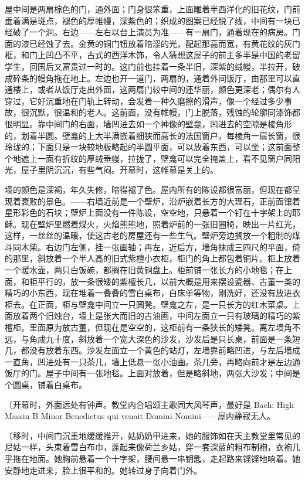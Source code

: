 屋中间是两扇棕色的门，通外面；门身很笨重，上面雕着半西洋化的旧花纹，门前垂着满是斑点，褪色的厚帷幔，深紫色的；织成的图案已经脱了线，中间有一块已经破了一个洞。右边——左右以台上演员为准——有一扇门，通着现在的病房。门面的漆已经蚀了去。金黄的铜门钮放着暗涩的光，配起那高而宽，有黄花纹的灰门框，和门上凹凸不平，古式的西洋木饰，令人猜想这屋子的前主多半是中国的老留学生，回国后又富贵过一时的。这门前也挂着一条半旧，深紫的绒幔，半拉开，破成碎条的幔角拖在地上。左边也开一道门，两扇的，通着外间饭厅，由那里可以直通楼上，或者从饭厅走出外面，这两扇门较中间的还华丽，颜色更深老；偶尔有人穿过，它好沉重地在门轨上转动，会发着一种久磨擦的滑声，像一个经过多少事故，很沉默，很温和的老人。这前面，没有帷幔，门上脱落，残蚀的轮廓同漆饰都很明显。靠中间门的右面，墙凹进去如一个神像的壁龛，凹进去的空隙是棱角形的，划着半圆。壁龛的上大半满嵌着细狭而高长的法国窗户，每棱角一扇长窗，很玲珑的；下面只是一块较地板略起的半圆平面，可以放着东西，可以坐；这前面整个地遮上一面有折纹的厚绒垂幔，拉拢了，壁龛可以完全掩盖上，看不见窗户同阳光，屋子里阴沉沉，有些气闷。开幕时，这帷幕是关上的。

墙的颜色是深褐，年久失修，暗得褪了色。屋内所有的陈设都很富丽，但现在都呈现着衰败的景色。——右墙近前是一个壁炉，沿炉嵌着长方的大理石，正前面镶着星形彩色的石块；壁炉上面没有一件陈设，空空地，只悬着一个钉在十字架上的耶稣。现在壁炉里燃着煤火，火焰熊熊地，照着炉前的一张旧圈椅，映出一片红光，这样，一丝丝的温暖，使这古老的房屋还有一些生气。壁炉旁边搁放一个粗制的煤斗同木柴。右边门左侧，挂一张画轴；再左，近后方，墙角抹成三四尺的平面，倚的那里，斜放着一个半人高的旧式紫檀小衣柜，柜门的角上都包着铜片。柜上放着一个暖水壶，两只白饭碗，都搁在旧黄铜盘上。柜前铺一张长方的小地毯；在上面，和柜平行的，放一条很矮的紫檀长几，以前大概是用来摆设瓷器、古董一类的精巧的小东西，现在堆着一叠叠的雪白桌布，白床单等物，刚洗好，还没有放进衣柜去。在正面，柜与壁龛中间立一只圆凳。壁龛之左，是一只长方的红木菜桌。上面放着两个旧烛台，墙上是张大而旧的古油画，中间左面立一只有玻璃的精巧的紫檀柜。里面原为放古董，但现在是空空的，这柜前有一条狭长的矮凳。离左墙角不远，与角成九十度，斜放着一个宽大深色的沙发，沙发后是只长桌，前面是一条短几，都没有放着东西。沙发左面立一个黄色的站灯，左墙靠前略凹进，与左后墙成一直角，凹进处有一只茶几，墙上低悬一张小油画。茶几旁，再略向前才是左边通饭厅的门。屋子中间有一张地毯。上面对放着，但是略斜地，两张大沙发；中间是个圆桌，铺着白桌布。

{\fangsong〔开幕时，外面远处有钟声。教堂内合唱颂主歌同大风琴声，最好是 Bach: High Massin B Minor Benedictus qui venait Domini Nomini——屋内静寂无人。}

{\fangsong〔移时，中间门沉重地缓缓推开，姑奶奶甲进来，她的服饰如在天主教堂里常见的尼姑一样，头束着雪白布巾，蓬起来像荷兰乡姑，穿一套深蓝的粗布制袍，衣袍几乎拖在地面。她胸前悬着一个十字架，腰间悬一串钥匙，走起路来铿铿地响着。她安静地走进来，脸上很平和的。她转过身子向着门外。}


